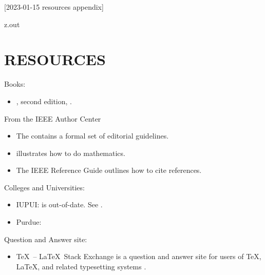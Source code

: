 [2023-01-15 resources appendix]

\begin{VerbatimOut}{z.out}
\chapter{RESOURCES}

Books:
\begin{itemize}
  \item
  , second edition, \cite{kottwitz2021}.
\end{itemize}
  
\noindent
From the
IEEE Author Center
\cite{ieee-author-center}
\begin{itemize}
  \item
    The
    \cite{ieee-editorial-style-manual-for-authors}
    contains a formal set of editorial guidelines.
  \item
    \cite{editing-mathematics}
    illustrates how to do mathematics.
  \item
    The
    IEEE Reference Guide
    \cite{ieee-reference-guide}
    outlines how to cite references.
\end{itemize}

\noindent
Colleges and Universities:
\begin{itemize}
  \item
    IUPUI:
    \cite{thesisdissertationiupui}
    is out-of-date.
    See
    \cite{thesisanddissertationoffice}.
  \item
    Purdue:
    \cite{thesisanddissertationoffice}
\end{itemize}

\noindent
Question and Answer site:
\begin{itemize}
  \item
    \TeX\ -- \LaTeX\ Stack Exchange
    is a question and answer site
    for users of
    \TeX,
    \LaTeX,
    and related typesetting systems
    \cite{tex-stackexchange}.
\end{itemize}
\end{VerbatimOut}

\MyIO
